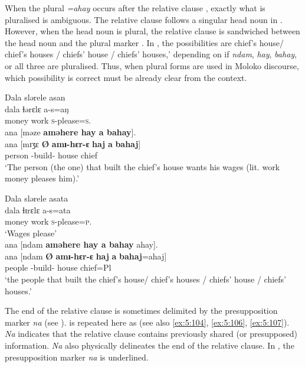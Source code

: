 When the plural \textit{=ahay}  occurs after the relative clause , exactly what is pluralised is ambiguous. The relative clause follows a singular head noun in . However, when the head noun is plural, the relative clause is sandwiched between the head noun and the plural marker . In , the possibilities are chief’s house/ chief’s houses / chiefs’ house / chiefs’ houses,’ depending on if \textit{ndam}, \textit{hay}, \textit{bahay}, or all three are pluralised. Thus, when plural forms are used in Moloko discourse, which possibility is correct must be already clear from the context. 

\ea \label{ex:5:112}
Dala  slərele  asan  \\
\gll  dala       ɬərɛlɛ      a-s=aŋ     \\
      money  work        \textsc{s}-please=\textsc{s}.{\IO}   \\
      
      \medskip
ana  [məze  \textbf{aməhere  hay  a  bahay}].\\
\gll   ana  [mɪʒɛ      \textbf{Ø}  \textbf{amɪ-hɛr-ɛ} \textbf{haj} \textbf{a}  \textbf{bahaj}]\\
{\DAT}   person   { } {\DEP}-build-{\CL}  house  {\GEN}      chief\\
\glt  ‘The person (the one) that built the chief’s house wants his wages (lit. work money pleases him).’
\z

\ea \label{ex:5:113}
Dala  slərele  asata \\ 
\gll  dala       ɬɪrɛlɛ    a-s=ata\\
      money    work  \textsc{s}-please=\textsc{p}.{\IO}\\
\glt  ‘Wages please’\\
\medskip
ana  [ndam  \textbf{aməhere  hay  a  bahay} ahay].\\
\gll ana [ndam \textbf{Ø} \textbf{amɪ-hɛr-ɛ} \textbf{haj} \textbf{a}  \textbf{bahaj}=ahaj] \\ 
{\DAT} people  { }  {\DEP}-build-{\CL}   house  {\GEN}  chief=Pl \\
\glt ‘the people that built the chief’s house/ chief’s houses / chiefs’ house / chiefs’ houses.’ 
\z

The end of the relative clause is sometimes delimited by the presupposition marker \textit{na} (see ).  is repeated here as  (see also \ref{ex:5:104}, \ref{ex:5:106}, \ref{ex:5:107}). \textit{Na} indicates that the relative clause contains previously shared (or presupposed) information. \textit{Na} also physically delineates the end of the relative clause. In , the presupposition marker \textit{na} is underlined. 


